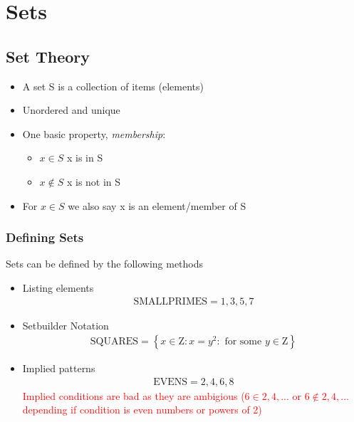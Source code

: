 \documentclass{book/custombook}
\author{Dinal Atapattu}
\begin{document}
    \maketitle
    \chapter{Sets}
        \section{Set Theory}
            \begin{itemize}
                \item A set S is a collection of items (elements)
                \item Unordered and unique
                \item One basic property, \textit{membership}:
                    \begin{itemize}
                        \item $x \in S$ x is in S
                        \item $x \notin S$ x is not in S
                    \end{itemize}
                \item For $x \in S$ we also say x is an element/member of S
            \end{itemize}
            \subsection{Defining Sets}
                Sets can be defined by the following methods
                \begin{itemize}
                    \item Listing elements
                        \begin{align*}
                            \text{SMALLPRIMES} = {1,3,5,7}
                        \end{align*}
                    \item Setbuilder Notation
                        \begin{align*}
                            \text{SQUARES} = \left\{ x \in \mathrm{Z} : x = y^2 : \text{ for some } y \in \mathrm{Z} \right\}
                        \end{align*}
                    \item Implied patterns
                        \begin{align*}
                            \text{EVENS} = {2,4,6,8}
                        \end{align*}
                        \textcolor{red}{Implied conditions are bad as they are ambigious ($6 \in {2,4,...}$ or 
                        $6 \notin {2,4,...}$ depending if condition is even numbers or powers of 2)}
                \end{itemize}
\end{document}
